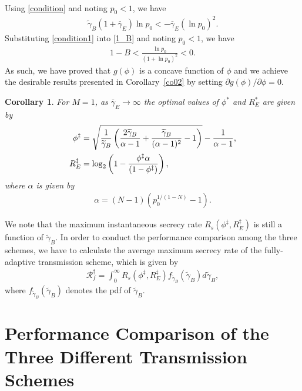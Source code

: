 \documentclass[journal]{IEEEtran}
\newtheorem{corollary}{\noindent \textbf{Corollary}}
\begin{document}
\begin{IEEEproof}
\begin{align}
\end{align}
Using \eqref{condition} and noting $p_0<1$, we have
\begin{align}\label{condition1}
\widetilde{\gamma}_B (1+\overline{\gamma}_E) \ln p_0 < - \overline{\gamma}_E (\ln p_0)^2.
\end{align}
Substituting \eqref{condition1} into \eqref{1_B} and noting $p_0<1$, we have
\begin{align}
1-B < \frac{\ln p_0}{(1+\ln p_0)^2} < 0.
\end{align}
As such, we have proved that $g(\phi)$ is a concave function of $\phi$ and we achieve the desirable results presented in Corollary~\ref{co02} by setting $\partial g(\phi)/\partial \phi = 0$.
\end{IEEEproof}

\begin{corollary}
For $M = 1$, as $\overline{\gamma}_E \rightarrow \infty$ the optimal values of $\phi^{\ast}$ and $R_E^{\ast}$ are given by
\begin{align}
\phi^{\ddag} &= \sqrt{\frac{1}{\widetilde{\gamma}_B}\left(\frac{2\widetilde{\gamma}_B }{\alpha - 1} + \frac{\widetilde{\gamma}_B}{(\alpha-1)^2} - 1\right)} - \frac{1}{\alpha - 1},\notag \\
R_E^{\ddag} &= \log_2\left(1-\frac{\phi^{\ddag} \alpha}{(1-\phi^{\ddag})}\right),\notag
\end{align}
where $\alpha$ is given by
\begin{align}
\alpha = (N-1) \left(p_0^{{1}/{(1-N)}}-1\right).
\end{align}
\end{corollary}

We note that the maximum instantaneous secrecy rate $R_s(\phi^{\ddag}, R_E^{\ddag})$ is still a function of $\widetilde{\gamma}_B$. In order to conduct the performance comparison among the three schemes, we have to calculate the average maximum secrecy rate of the fully-adaptive transmission scheme, which is given by
\begin{align}
\mathcal{R}_f^{\ddag} = \int_0^{\infty} R_s(\phi^{\ddag}, R_E^{\ddag}) f_{\widetilde{\gamma}_B}(\widetilde{\gamma}_B) d \widetilde{\gamma}_B,
\end{align}
where $f_{\widetilde{\gamma}_B}(\widetilde{\gamma}_B)$ denotes the pdf of $\widetilde{\gamma}_B$.

\section{Performance Comparison of the Three Different Transmission Schemes}
\end{document}
